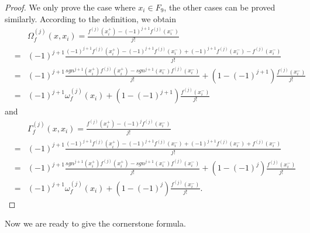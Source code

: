 \documentclass{article}
\begin{document}
\begin{proof}
    We only prove the case where $x_{i}\in F_{9}$, the other cases can be proved similarly. According to the definition, we obtain
    \begin{eqnarray*}
        &&\Omega_{f}^{(j)}(x, x_{i})=\frac{f^{(j)}(x_{i}^{+})-(-1)^{j+1}f^{(j)}(x_{i}^{-})}{j!}\\
        &=&(-1)^{j+1}\frac{(-1)^{j+1}f^{(j)}(x_{i}^{+})-(-1)^{j+1}f^{(j)}(x_{i}^{-})+(-1)^{j+1}f^{(j)}(x_{i}^{-})-f^{(j)}(x_{i}^{-})}{j!}\\
        &=&(-1)^{j+1}\frac{sgn^{j+1}(x_{i}^{+})f^{(j)}(x_{i}^{+})-sgn^{j+1}(x_{i}^{-})f^{(j)}(x_{i}^{-})}{j!}+(1-(-1)^{j+1})\frac{f^{(j)}(x_{i}^{-})}{j!}\\
        &=&(-1)^{j+1}\omega_{f}^{(j)}(x_{i})+(1-(-1)^{j+1})\frac{f^{(j)}(x_{i}^{-})}{j!}
    \end{eqnarray*}
    and
    \begin{eqnarray*}
        &&\Gamma_{f}^{(j)}(x, x_{i})=\frac{f^{(j)}(x_{i}^{+})-(-1)^{j}f^{(j)}(x_{i}^{-})}{j!}\\
        &=&(-1)^{j+1}\frac{(-1)^{j+1}f^{(j)}(x_{i}^{+})-(-1)^{j+1}f^{(j)}(x_{i}^{-})+(-1)^{j+1}f^{(j)}(x_{i}^{-})+f^{(j)}(x_{i}^{-})}{j!}\\
        &=&(-1)^{j+1}\frac{sgn^{j+1}(x_{i}^{+})f^{(j)}(x_{i}^{+})-sgn^{j+1}(x_{i}^{-})f^{(j)}(x_{i}^{-})}{j!}+(1-(-1)^{j})\frac{f^{(j)}(x_{i}^{-})}{j!}\\
        &=&(-1)^{j+1}\omega_{f}^{(j)}(x_{i})+(1-(-1)^{j})\frac{f^{(j)}(x_{i}^{-})}{j!}.
    \end{eqnarray*}
\end{proof}

Now we are ready to give the cornerstone formula.
\end{document}
